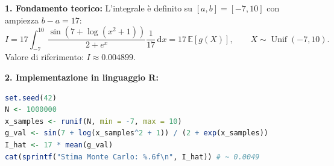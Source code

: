 \documentclass[11pt,a4paper]{article}
\newcommand{\EE}{\mathbb{E}}
\newcommand{\dx}{\mathrm{d}x}
\begin{document}
\begin{soluzionebox}
\textbf{1. Fondamento teorico:}
L'integrale è definito su $[a, b] = [-7, 10]$ con ampiezza $b - a = 17$:
\[
I = 17 \int_{-7}^{10} \frac{\sin(7 + \log(x^2 + 1))}{2 + e^x} \frac{1}{17} \, \dx = 17 \, \EE[g(X)], \qquad X \sim \operatorname{Unif}(-7, 10).
\]
Valore di riferimento: $I \approx \mathbf{0.004899}$.

\textbf{2. Implementazione in linguaggio R:}
\begin{lstlisting}[language=R]
set.seed(42)
N <- 1000000
x_samples <- runif(N, min = -7, max = 10)
g_val <- sin(7 + log(x_samples^2 + 1)) / (2 + exp(x_samples))
I_hat <- 17 * mean(g_val)
cat(sprintf("Stima Monte Carlo: %.6f\n", I_hat)) # ~ 0.0049
\end{lstlisting}
\end{soluzionebox}
\end{document}
